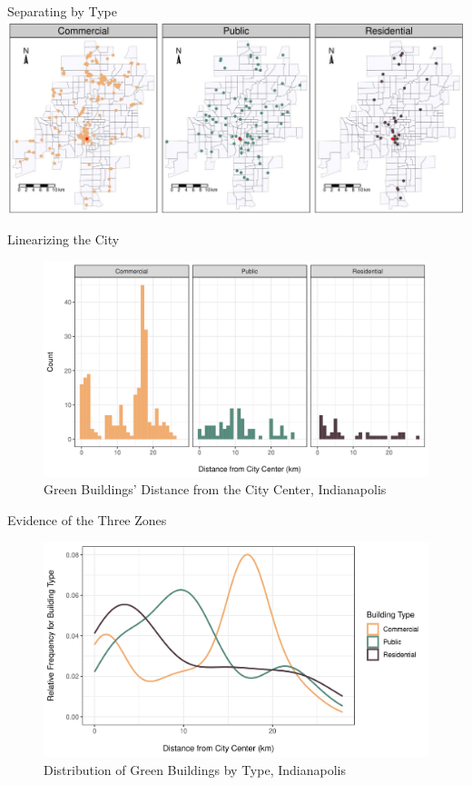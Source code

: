 \documentclass[11pt]{beamer}
\begin{document}
\begin{frame}{Separating by Type}
\centering
{}
\includegraphics[width=\textwidth]{indPoints-1.jpg}
\end{frame}


\begin{frame}{Linearizing the City}

\begin{figure}
\caption{Green Buildings' Distance from the City Center, Indianapolis}
\centering
\includegraphics[width=\textwidth]{indHist-1.png}
\end{figure}

\end{frame}


\begin{frame}{Evidence of the Three Zones}

\begin{figure}
\caption{Distribution of Green Buildings by Type, Indianapolis}
\centering
\includegraphics[width=\textwidth]{indDensity-1.png}
\end{figure}

\end{frame}
\end{document}
